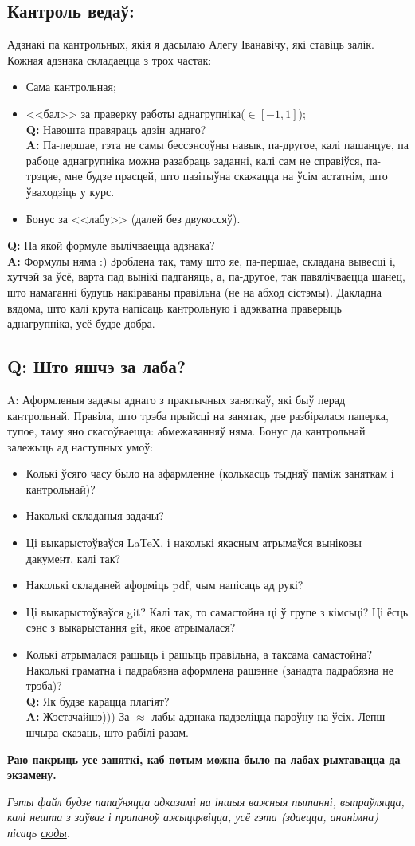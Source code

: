 \documentclass[12pt, a4paper]{extarticle}
\newcommand{\formQA}[2]{%
	\noindent \textbf{Q:} #1 \\
	\textbf{A:} #2
}
\begin{document}
	\subsection{Кантроль ведаў:}
	Адзнакі па кантрольных, якія я дасылаю Алегу Іванавічу, які ставіць залік. Кожная адзнака складаецца з трох частак: 
	\begin{itemize}
		\item Сама кантрольная;
		\item <<бал>> за праверку работы аднагрупніка($\in [-1, 1]$); \\[6pt]
		\formQA{Навошта правяраць адзін аднаго?}
		{Па-першае, гэта не самы бессэнсоўны навык, па-другое, калі пашанцуе, па рабоце аднагрупніка можна разабраць заданні, калі сам не справіўся, па-трэцяе, мне будзе прасцей, што пазітыўна скажацца на ўсім астатнім, што ўваходзіць у курс.}
		\item Бонус за <<лабу>> (далей без двукоссяў).
	\end{itemize}
	\formQA{Па якой формуле вылічваецца адзнака?}
	{Формулы няма :) Зроблена так, таму што яе, па-першае, складана вывесці і, хутчэй за ўсё, варта пад вынікі падганяць, а, па-другое, так павялічваецца шанец, што намаганні будуць накіраваны правільна (не на абход сістэмы). Дакладна вядома, што калі крута напісаць кантрольную і адэкватна праверыць аднагрупніка, усё будзе добра.}
	\subsection{Q: Што яшчэ за лаба?}
	{\large A:} Аформленыя задачы аднаго з практычных заняткаў, які быў перад кантрольнай. Правіла, што трэба прыйсці на занятак, дзе разбіралася паперка, тупое, таму яно скасоўваецца: абмежаванняў няма. Бонус да кантрольнай залежыць ад наступных умоў:
	\begin{itemize}
		\item Колькі ўсяго часу было на афармленне (колькасць тыдняў паміж заняткам і кантрольнай)?
		\item Наколькі складаныя задачы?
		\item Ці выкарыстоўваўся \LaTeX, і наколькі якасным атрымаўся выніковы дакумент, калі так?
		\item Наколькі складаней аформіць pdf, чым напісаць ад рукі?
		\item Ці выкарыстоўваўся git? Калі так, то самастойна ці ў групе з кімсьці? Ці ёсць сэнс з выкарыстання git, якое атрымалася?
		\item Колькі атрымалася рашыць і рашыць правільна, а таксама самастойна? Наколькі граматна і падрабязна аформлена рашэнне (занадта падрабязна не трэба)? \\[6pt]
		\formQA{Як будзе карацца плагіят?}
		{Жэстачайшэ))) За $\approx$ лабы адзнака падзеліцца пароўну на ўсіх. Лепш шчыра сказаць, што рабілі разам.}
	\end{itemize}

	\textbf{Раю пакрыць усе заняткі, каб потым можна было па лабах рыхтавацца да экзамену.}
	
	\textit{Гэты файл будзе папаўняцца адказамі на іншыя важныя пытанні, выпраўляцца, калі нешта з заўваг і прапаноў ажыццявіцца, усё гэта (здаецца, ананімна) пісаць \href{https://docs.google.com/document/d/1La38_lqT7PtdRVmlvKIVh_7rIWvHqPBFG7yrWFoKkFM/edit?usp=sharing}{сюды}.}
\end{document}
